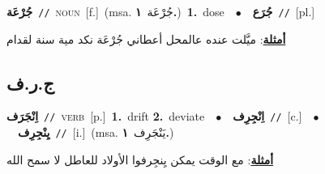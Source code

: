 \documentclass[10pt,a4paper,twoside]{article} %
\begin{document}
\begin{multicols}{2}
{\setlength\topsep{0pt}\textbf{\foreignlanguage{arabic}{جُرْعَة}}\ {\color{gray}\texttt{//}\color{black}}\ \textsc{noun}\ [f.]\ \color{gray}(msa. \foreignlanguage{arabic}{جُرْعَة}~\foreignlanguage{arabic}{\textbf{١.}})\color{black}\ \textbf{1.}~dose\ \ $\bullet$\ \ \setlength\topsep{0pt}\textbf{\foreignlanguage{arabic}{جُرَع}}\ {\color{gray}\texttt{//}\color{black}}\ [pl.]\  \begin{flushright}\color{gray}\foreignlanguage{arabic}{\textbf{\underline{\foreignlanguage{arabic}{أمثلة}}}: ميَّلت عنده عالمحل أعطاني جُرْعَة نكد مية سنة لقدام}\end{flushright}\color{black}} \vspace{2mm}

\vspace{-3mm}
\subsection*{\color{blue}\foreignlanguage{arabic}{ج.ر.ف}\color{blue}{}} 

{\setlength\topsep{0pt}\textbf{\foreignlanguage{arabic}{اِنْجَرَف}}\ {\color{gray}\texttt{//}\color{black}}\ \textsc{verb}\ [p.]\ \textbf{1.}~drift  \textbf{2.}~deviate\ \ $\bullet$\ \ \setlength\topsep{0pt}\textbf{\foreignlanguage{arabic}{اِنْجِرِف}}\ {\color{gray}\texttt{//}\color{black}}\ [c.]\ \ $\bullet$\ \ \setlength\topsep{0pt}\textbf{\foreignlanguage{arabic}{يِنْجِرِف}}\ {\color{gray}\texttt{//}\color{black}}\ [i.]\ \color{gray}(msa. \foreignlanguage{arabic}{يَنْجَرِف}~\foreignlanguage{arabic}{\textbf{١.}})\color{black}\  \begin{flushright}\color{gray}\foreignlanguage{arabic}{\textbf{\underline{\foreignlanguage{arabic}{أمثلة}}}: مع الوقت يمكن يِنجِرفوا الأولاد للعاطل لا سمح الله}\end{flushright}\color{black}} \vspace{2mm}


\end{multicols}
\end{document}
